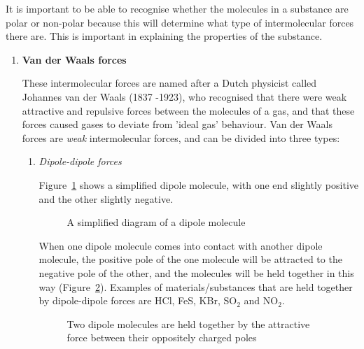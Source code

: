 It is important to be able to recognise whether the molecules in a substance are polar or non-polar because this will determine what type of intermolecular forces there are. This is important in explaining the properties of the substance.

\begin{enumerate}
\item{\textbf{Van der Waals forces}}

These intermolecular forces are named after a Dutch physicist called Johannes van der Waals (1837 -1923), who recognised that there were weak attractive and repulsive forces between the molecules of a gas, and that these forces caused gases to deviate from 'ideal gas' behaviour. Van der Waals forces are \textit{weak} intermolecular forces, and can be divided into three types:

\begin{enumerate}
\item{\textit{Dipole-dipole forces}

Figure~\ref{fig:dipole} shows a simplified dipole molecule, with one end slightly positive and the other slightly negative.

\begin{figure}[H]
\begin{center}
\caption{A simplified diagram of a dipole molecule}
\label{fig:dipole}
\end{center}
\end{figure}

When one dipole molecule comes into contact with another dipole molecule, the positive pole of the one molecule will be attracted to the negative pole of the other, and the molecules will be held together in this way (Figure~\ref{fig:dipole-dipole}). Examples of materials/substances that are held together by dipole-dipole forces are HCl, FeS, KBr, SO$_{2}$ and NO$_{2}$.

\begin{figure}[H]
\begin{center}
\end{center}
\caption{Two dipole molecules are held together by the attractive force between their oppositely charged poles}
\label{fig:dipole-dipole}
\end{figure}
}


\end{enumerate}
\end{enumerate}

